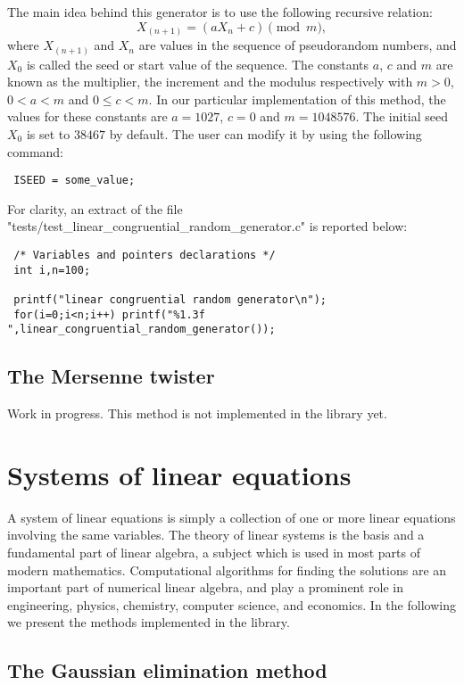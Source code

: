 \documentclass{book}
\begin{document}
The main idea behind this generator is to use the following recursive relation:
$$
 X_{(n+1)} = (a X_n + c) \pmod m,
$$
where $X_{(n+1)}$ and $X_n$ are values in the sequence of pseudorandom numbers, and $X_0$ is called the seed or start value of the sequence.
The constants $a$, $c$ and $m$ are known as the multiplier, the increment and the modulus respectively with $m>0$, $0<a<m$ and $0 \le c<m$. In our particular
implementation of this method, the values for these constants are $a=1027$, $c=0$ and $m=1048576$. The initial seed $X_0$ is set to $38467$ by default. The user
can modify it by using the following command:
\begin{lstlisting}
 ISEED = some_value;
\end{lstlisting}

For clarity, an extract of the file "tests/test\_linear\_congruential\_random\_generator.c" is reported below:
\begin{lstlisting}
 /* Variables and pointers declarations */
 int i,n=100;

 printf("linear congruential random generator\n");
 for(i=0;i<n;i++) printf("%1.3f ",linear_congruential_random_generator());
\end{lstlisting}

\subsection{The Mersenne twister}

Work in progress. This method is not implemented in the library yet.


\section{Systems of linear equations}

A system of linear equations is simply a collection of one or more linear equations involving the same variables.
The theory of linear systems is the basis and a fundamental part of linear algebra, a subject which is used in
most parts of modern mathematics. Computational algorithms for finding the solutions are an important part of
numerical linear algebra, and play a prominent role in engineering, physics, chemistry, computer science, and economics.
In the following we present the methods implemented in the library.

\subsection{The Gaussian elimination method}
\end{document}
